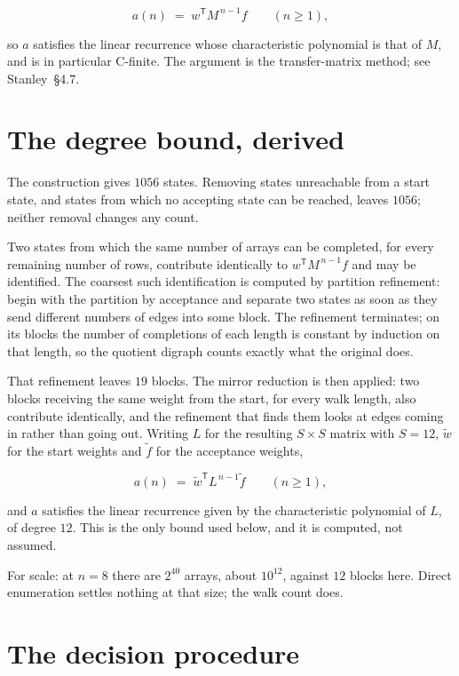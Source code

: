 \documentclass[11pt]{article}
\theoremstyle{definition}
\begin{document}
\[a(n) \;=\; w^{\mathsf T} M^{\,n-1} f \qquad (n \ge 1),\]

so $a$ satisfies the linear recurrence whose characteristic polynomial is that of $M$, and is in particular C-finite. The argument is the transfer-matrix method; see Stanley~\S4.7.

\section{The degree bound, derived}

The construction gives $1056$ states. Removing states unreachable from a start state, and states from which no accepting state can be reached, leaves $1056$; neither removal changes any count.

Two states from which the same number of arrays can be completed, for every remaining number of rows, contribute identically to $w^{\mathsf T}M^{\,n-1}f$ and may be identified. The coarsest such identification is computed by partition refinement: begin with the partition by acceptance and separate two states as soon as they send different numbers of edges into some block. The refinement terminates; on its blocks the number of completions of each length is constant by induction on that length, so the quotient digraph counts exactly what the original does.

That refinement leaves $19$ blocks. The mirror reduction is then applied: two blocks receiving the same weight from the start, for every walk length, also contribute identically, and the refinement that finds them looks at edges coming in rather than going out. Writing $L$ for the resulting $S \times S$ matrix with $S = 12$, $\tilde w$ for the start weights and $\tilde f$ for the acceptance weights,

\[a(n) \;=\; \tilde w^{\mathsf T} L^{\,n-1} \tilde f \qquad (n \ge 1),\]

and $a$ satisfies the linear recurrence given by the characteristic polynomial of $L$, of degree $12$. This is the only bound used below, and it is computed, not assumed.

For scale: at $n = 8$ there are $2^{40}$ arrays, about $10^{12}$, against $12$ blocks here. Direct enumeration settles nothing at that size; the walk count does.

\section{The decision procedure}
\end{document}
